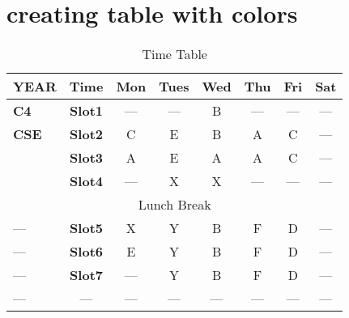 \documentclass{article}
\begin{document}
	
	\section{creating table with colors}
	
	
	\begin{table}[h]
		\centering
		\begin{tabular}{|p{2cm}||c|c|c|c|c|c|c|}
			\hline
			\textbf{YEAR}&\textbf{Time}&\textbf{Mon}&\textbf{Tues}&\textbf{Wed}&\textbf{Thu}&\textbf{Fri}&\textbf{Sat}\\
			\hline
			\textbf{C4}&\textbf{Slot1}&---&---&\cellcolor{red}B&---&---&---\\
			\hline
			\textbf{CSE}&\textbf{Slot2}&\cellcolor{orange}C&\cellcolor{yellow}E&\cellcolor{red}B&\cellcolor{blue}A&\cellcolor{orange}C&---\\
			\hline
			\textbf{   }&\textbf{Slot3}&\cellcolor{blue}A&\cellcolor{yellow}E&\cellcolor{blue}A&\cellcolor{blue}A&\cellcolor{orange}C&---\\
			\hline
			\textbf{     }&\textbf{Slot4}&---&\cellcolor{green}X&\cellcolor{green}X&---&---&---\\
			\hline
			\multicolumn{8}{|c|}{Lunch Break}\\
			\hline
			---&\textbf{Slot5}&\cellcolor{green}X&\cellcolor{pink}Y&\cellcolor{red}B&\cellcolor{yellow}F&\cellcolor{orange}D&---\\
			\hline
			---&\textbf{Slot6}&\cellcolor{yellow}E&\cellcolor{pink}Y&\cellcolor{red}B&\cellcolor{yellow}F&\cellcolor{orange}D&---\\
			\hline
			---&\textbf{Slot7}&---&\cellcolor{pink}Y&\cellcolor{red}B&\cellcolor{yellow}F&\cellcolor{orange}D&---\\
			\hline
			---&---&---&---&---&---&---&---\\
			\hline
		\end{tabular}
		\caption{Time Table}
		\label{tab:Example}
	\end{table}
\end{document}
